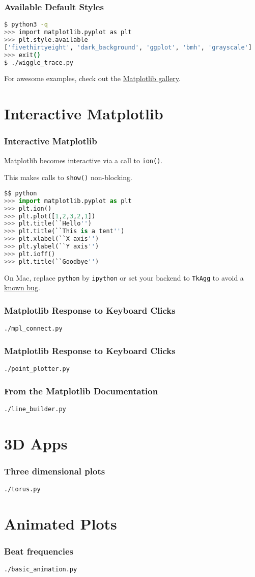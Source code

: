 \documentclass{beamer}
\begin{document}
\begin{frame}[fragile]
\frametitle{Available Default Styles}

\begin{lstlisting}[language=bash]
$ python3 -q
>>> import matplotlib.pyplot as plt
>>> plt.style.available
['fivethirtyeight', 'dark_background', 'ggplot', 'bmh', 'grayscale']
>>> exit()
$ ./wiggle_trace.py
\end{lstlisting}
\end{frame}

\begin{frame}
For awesome examples, check out the \href{http://matplotlib.org/gallery.html}{Matplotlib gallery}.
\end{frame}

\section{Interactive Matplotlib}
\begin{frame}[fragile]
\frametitle{Interactive Matplotlib}

Matplotlib becomes interactive via a call to \texttt{ion()}.

This makes calls to \texttt{show()} non-blocking.
\begin{lstlisting}[language=Python]
$$ python
>>> import matplotlib.pyplot as plt
>>> plt.ion()
>>> plt.plot([1,2,3,2,1])
>>> plt.title(``Hello'')
>>> plt.title(``This is a tent'')
>>> plt.xlabel(``X axis'')
>>> plt.ylabel(``Y axis'')
>>> plt.ioff()
>>> plt.title(``Goodbye'')
\end{lstlisting}
On Mac, replace \texttt{python} by \texttt{ipython} or set your backend to \texttt{TkAgg} to avoid a \href{http://stackoverflow.com/questions/25960000/interactive-mode-doesnt-switch-on-from-script-matplotlib-1-4-0-python-2-7-5-on}{known bug}.
\end{frame}

\begin{frame}[fragile]
\frametitle{Matplotlib Response to Keyboard Clicks}
\texttt{./mpl\_connect.py}
\end{frame}

\begin{frame}[fragile]
\frametitle{Matplotlib Response to Keyboard Clicks}
\texttt{./point\_plotter.py}
\end{frame}

\begin{frame}[fragile]
\frametitle{From the Matplotlib Documentation}
\texttt{./line\_builder.py}
\end{frame}

\section{3D Apps}
\begin{frame}[fragile]
\frametitle{Three dimensional plots}
\texttt{./torus.py}
\end{frame}

\section{Animated Plots}
\begin{frame}[fragile]
\frametitle{Beat frequencies}
\texttt{./basic\_animation.py}
\end{frame}
\end{document}

